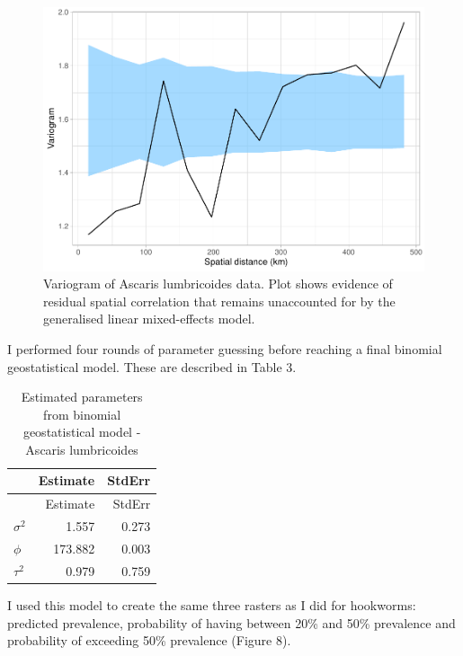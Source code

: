 \documentclass[
]{article}
\begin{document}
\begin{figure}
\centering
\includegraphics{write_up_files/figure-latex/Asc.variogram_2-1.pdf}
\caption{Variogram of Ascaris lumbricoides data. Plot shows evidence of
residual spatial correlation that remains unaccounted for by the
generalised linear mixed-effects model.}
\end{figure}

I performed four rounds of parameter guessing before reaching a final
binomial geostatistical model. These are described in Table 3.

\begin{longtable}[]{@{}lrr@{}}
\caption{Estimated parameters from binomial geostatistical model -
Ascaris lumbricoides}\tabularnewline
\toprule
& Estimate & StdErr \\
\midrule
\endfirsthead
\toprule
& Estimate & StdErr \\
\midrule
\endhead
\(\sigma^2\) & 1.557 & 0.273 \\
\(\phi\) & 173.882 & 0.003 \\
\(\tau^2\) & 0.979 & 0.759 \\
\bottomrule
\end{longtable}

I used this model to create the same three rasters as I did for
hookworms: predicted prevalence, probability of having between 20\% and
50\% prevalence and probability of exceeding 50\% prevalence (Figure 8).
\end{document}
